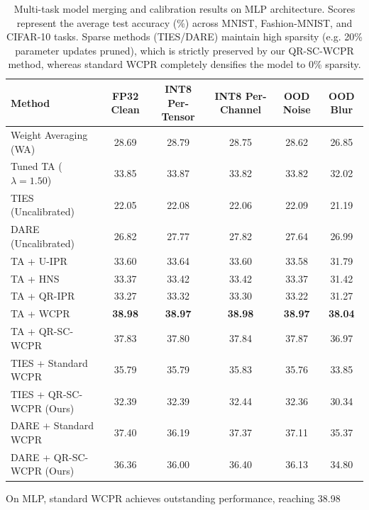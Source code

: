 \documentclass{article}
\theoremstyle{plain}
\theoremstyle{definition}
\theoremstyle{remark}
\begin{document}
\begin{table}[t]
\caption{Multi-task model merging and calibration results on MLP architecture. Scores represent the average test accuracy (\%) across MNIST, Fashion-MNIST, and CIFAR-10 tasks. Sparse methods (TIES/DARE) maintain high sparsity (e.g. 20\% parameter updates pruned), which is strictly preserved by our QR-SC-WCPR method, whereas standard WCPR completely densifies the model to 0\% sparsity.}
\label{tab:mlp_results}
\begin{center}
\begin{footnotesize}
\begin{tabular}{lccccc}
\toprule
\textbf{Method} & \textbf{FP32 Clean} & \textbf{INT8 Per-Tensor} & \textbf{INT8 Per-Channel} & \textbf{OOD Noise} & \textbf{OOD Blur} \\
\midrule
Weight Averaging (WA) & 28.69 & 28.79 & 28.75 & 28.62 & 26.85 \\
Tuned TA ($\lambda=1.50$) & 33.85 & 33.87 & 33.82 & 33.82 & 32.02 \\
\midrule
TIES (Uncalibrated) & 22.05 & 22.08 & 22.06 & 22.09 & 21.19 \\
DARE (Uncalibrated) & 26.82 & 27.77 & 27.82 & 27.64 & 26.99 \\
\midrule
TA + U-IPR & 33.60 & 33.64 & 33.60 & 33.58 & 31.79 \\
TA + HNS & 33.37 & 33.42 & 33.42 & 33.37 & 31.42 \\
TA + QR-IPR & 33.27 & 33.32 & 33.30 & 33.22 & 31.27 \\
TA + WCPR & \textbf{38.98} & \textbf{38.97} & \textbf{38.98} & \textbf{38.97} & \textbf{38.04} \\
TA + QR-SC-WCPR & 37.83 & 37.80 & 37.84 & 37.87 & 36.97 \\
\midrule
TIES + Standard WCPR & 35.79 & 35.79 & 35.83 & 35.76 & 33.85 \\
TIES + QR-SC-WCPR (Ours) & 32.39 & 32.39 & 32.44 & 32.36 & 30.34 \\
DARE + Standard WCPR & 37.40 & 36.19 & 37.37 & 37.11 & 35.37 \\
DARE + QR-SC-WCPR (Ours) & 36.36 & 36.00 & 36.40 & 36.13 & 34.80 \\
\bottomrule
\end{tabular}
\end{footnotesize}
\end{center}
\end{table}

On MLP, standard WCPR achieves outstanding performance, reaching 38.98%
\end{document}
